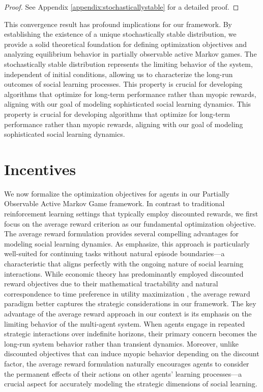 \begin{proof}
    See Appendix \ref{appendix:stochasticallystable} for a detailed proof.
\end{proof}
This convergence result has profound implications for our framework. By establishing the existence of a unique stochastically stable distribution, we provide a solid theoretical foundation for defining optimization objectives and analyzing equilibrium behavior in partially observable active Markov games. The stochastically stable distribution represents the limiting behavior of the system, independent of initial conditions, allowing us to characterize the long-run outcomes of social learning processes. This property is crucial for developing algorithms that optimize for long-term performance rather than myopic rewards, aligning with our goal of modeling sophisticated social learning dynamics. This property is crucial for developing algorithms that optimize for long-term performance rather than myopic rewards, aligning with our goal of modeling sophisticated social learning dynamics.

\section{Incentives}
We now formalize the optimization objectives for agents in our Partially Observable Active Markov Game framework. In contrast to traditional reinforcement learning settings that typically employ discounted rewards, we first focus on the average reward criterion as our fundamental optimization objective.
The average reward formulation provides several compelling advantages for modeling social learning dynamics. As \citet{sutton2018reinforcement} emphasize, this approach is particularly well-suited for continuing tasks without natural episode boundaries—a characteristic that aligns perfectly with the ongoing nature of social learning interactions. While economic theory has predominantly employed discounted reward objectives due to their mathematical tractability and natural correspondence to time preference in utility maximization \citep{koopmans1960stationary, stokey1989recursive}, the average reward paradigm better captures the strategic considerations in our framework.
The key advantage of the average reward approach in our context is its emphasis on the limiting behavior of the multi-agent system. When agents engage in repeated strategic interactions over indefinite horizons, their primary concern becomes the long-run system behavior rather than transient dynamics. Moreover, unlike discounted objectives that can induce myopic behavior depending on the discount factor, the average reward formulation naturally encourages agents to consider the permanent effects of their actions on other agents' learning processes—a crucial aspect for accurately modeling the strategic dimensions of social learning.

